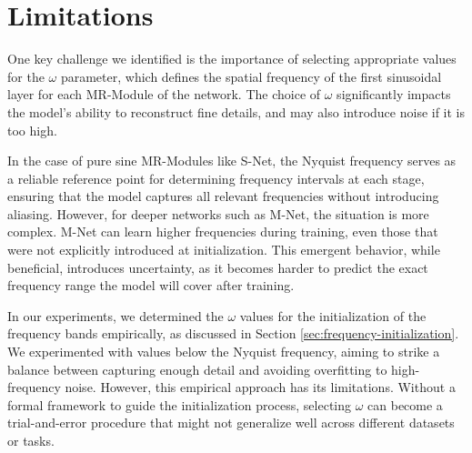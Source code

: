 

\section{Limitations}

One key challenge we identified is the importance of selecting appropriate values for the $\omega$ parameter, which defines the spatial frequency of the first sinusoidal layer for each MR-Module of the network. The choice of $\omega$ significantly impacts the model's ability to reconstruct fine details, and may also introduce noise if it is too high.

In the case of pure sine MR-Modules like S-Net, the Nyquist frequency serves as a reliable reference point for determining frequency intervals at each stage, ensuring that the model captures all relevant frequencies without introducing aliasing. However, for deeper networks such as M-Net, the situation is more complex. M-Net can learn higher frequencies during training, even those that were not explicitly introduced at initialization. This emergent behavior, while beneficial, introduces uncertainty, as it becomes harder to predict the exact frequency range the model will cover after training.


In our experiments, we determined the $\omega$ values for the initialization of the frequency bands empirically, as discussed in Section \ref{sec:frequency-initialization}. We experimented with values below the Nyquist frequency, aiming to strike a balance between capturing enough detail and avoiding overfitting to high-frequency noise. However, this empirical approach has its limitations. Without a formal framework to guide the initialization process, selecting $\omega$ can become a trial-and-error procedure that might not generalize well across different datasets or tasks.

